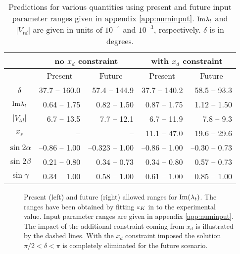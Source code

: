 \begin{table}[htb]
\caption[]{
Predictions for various quantities using present and future input
parameter ranges given in appendix \ref{app:numinput}.
${\rm Im}\lambda_t$ and $|V_{td}|$ are given
in units of $10^{-4}$ and $10^{-3}$, respectively. $\delta$ is in degrees.
\label{tab:predictions}}
\begin{center}
\begin{tabular}{|c|r|r|r|r|}
& \multicolumn{2}{c|}{no   $x_d$ constraint} &
  \multicolumn{2}{c|}{with $x_d$ constraint} \\
\hline
& \multicolumn{1}{c|}{Present} & \multicolumn{1}{c|}{Future} &
  \multicolumn{1}{c|}{Present} & \multicolumn{1}{c|}{Future} \\
\hline
$\delta$                     & 37.7 -- 160.0 & 57.4 -- 144.9
                             & 37.7 -- 140.2 & 58.5 -- 93.3 \\
${\rm Im}\lambda_t$              & 0.64 -- 1.75 & 0.82 -- 1.50
                             & 0.87 -- 1.75 & 1.12 -- 1.50 \\
$|V_{td}| $                  & 6.7 -- 13.5 & 7.7 -- 12.1
                             & 6.7 -- 11.9 & 7.8 -- 9.3 \\
$x_s$                        &  --  &  -- 
                             & 11.1 -- 47.0 & 19.6 -- 29.6 \\
$\sin 2\alpha$               & --0.86 -- 1.00 & --0.323 -- 1.00
                             & --0.86 -- 1.00 & --0.30 -- 0.73 \\
$\sin 2\beta$                & 0.21 -- 0.80 & 0.34 -- 0.73
                             & 0.34 -- 0.80 & 0.57 -- 0.73 \\
$\sin\gamma$                 & 0.34 -- 1.00 & 0.58 -- 1.00
                             & 0.61 -- 1.00 & 0.85 -- 1.00 \\
\end{tabular}
\end{center}
\end{table}

\begin{figure}[hbt]
\vspace{0.10in}
\centerline{
\epsfysize=5in
 }
\vspace{0.08in}
\caption[]{
Present (left) and future (right) allowed ranges for ${\rm Im}(\lambda_t)$.
The ranges have been obtained by fitting $\varepsilon_K$ in  to 
the experimental value. Input parameter ranges are given in appendix
\ref{app:numinput}. The impact of the additional constraint coming from
$x_d$ is illustrated by the dashed lines. With the $x_d$ constraint
imposed the solution $\pi/2 < \delta < \pi$ is completely eliminated
for the future scenario.
\label{fig:ut:imtimltxd}}
\end{figure}

